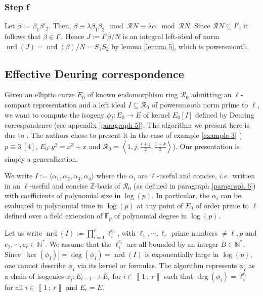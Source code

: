 \documentclass[a4paper,10pt]{report}
\theoremstyle{definition}
\theoremstyle{plain}
\theoremstyle{definition}
\newcommand{\ie}{\emph{i.e.}\ }
\newcommand{\N}{\mathbb{N}}
\newcommand{\Z}{\mathbb{Z}}
\newcommand{\F}{\mathbb{F}}
\newcommand{\m}[1]{\mathcal{#1}}
\renewcommand{\i}[2]{\left\llbracket #1~;~#2\right\rrbracket}
\renewcommand{\(}{\left(}
\renewcommand{\)}{\right)}
\DeclareMathOperator{\nrd}{nrd}
\begin{document}
\subsubsection{Step f}

Let $\beta:=\beta_1\beta'_2$. Then, $\beta\equiv \lambda\beta_1\beta_2 \mod \m{R}N\equiv \lambda\alpha \mod \m{R}N$. Since $\m{R}N\subseteq I'$, it follows that $\beta\in I'$. Hence $J:=I'\overline{\beta}/N$ is an integral left-ideal of norm $\nrd(J)=\nrd(\beta)/N=S_1S_2$ by lemma \ref{lemma 5}, which is powersmooth. 

\subsection{Effective Deuring correspondence}\label{paragraph 4}

Given an elliptic curve $E_0$ of known endomorphism ring $\m{R}_0$ admitting an $\ell$-compact representation and a left ideal $I\subseteq \m{R}_0$ of powersmooth norm prime to $\ell$, we want to compute the isogeny $\phi_I : E_0\longrightarrow E$ of kernel $E_0[I]$ defined by Deuring correspondence (see appendix \ref{paragraph 5}). The algorithm we present here is due to \cite{Galbraith2016}. The authors chose to present it in the case of example \ref{example 3} ($p\equiv 3 \ [4]$, $E_0:y^2=x^3+x$ and $\m{R}_0=\left \langle 1, j,\frac{i+j}{2},\frac{1+k}{2}\right\rangle$). Our presentation is simply a generalization.

We write $I:=\langle\alpha_1,\alpha_2,\alpha_3,\alpha_4\rangle$ where the $\alpha_i$ are $\ell$-useful and concise, \ie written in an $\ell$-useful and concise $\Z$-basis of $\m{R}_0$ (as defined in paragraph \ref{paragraph 6}) with coefficients of polynomial size in $\log(p)$.  In particular, the $\alpha_i$ can be evaluated in polynomial time in $\log(p)$ at any point of $E_0$ of order prime to $\ell$ defined over a field extension of $\F_p$ of polynomial degree in $\log(p)$.  

Let us write $\nrd(I):=\prod_{i=1}^r \ell_i^{e_i}$, with $\ell_1, \cdots,\ell_r$ prime numbers $\neq \ell, p$ and $e_1,\cdots, e_r\in\N^*$. We assume that the $\ell_i^{e_i}$ are all bounded by an integer $B\in\N^*$.  Since $|\ker(\phi_I)|=\deg(\phi_I)=\nrd(I)$ is exponentially large in $\log(p)$, one cannot describe $\phi_I$ via its kernel or formulas. The algorithm represents $\phi_I$ as a chain of isogenies $\phi_i : E_{i-1}\longrightarrow E_{i}$ for $i\in\i{1}{r}$ such that $\deg(\phi_i)=\ell_i^{e_i}$ for all $i\in\i{1}{r}$ and $E_r=E$. 
\end{document}
